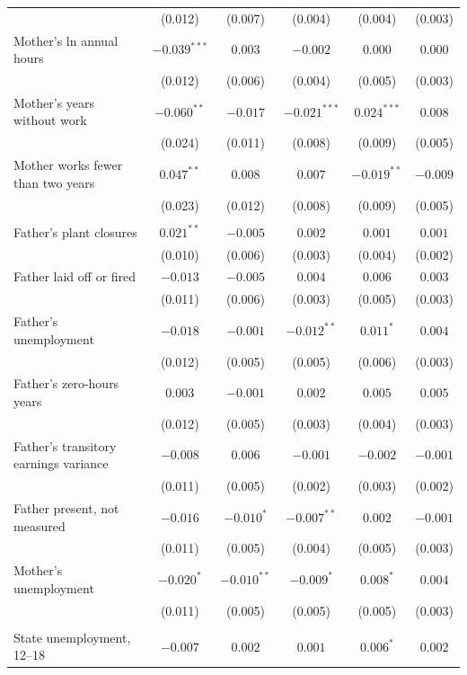 \begin{table}[!htbp]
{{\begin{tabular}{lccccc}
 & (0.012) & (0.007) & (0.004) & (0.004) & (0.003) \\
Mother's ln annual hours & $-0.039^{***}$ & $0.003$ & $-0.002$ & $0.000$ & $0.000$ \\
 & (0.012) & (0.006) & (0.004) & (0.005) & (0.003) \\
Mother's years without work & $-0.060^{**}$ & $-0.017$ & $-0.021^{***}$ & $0.024^{***}$ & $0.008$ \\
 & (0.024) & (0.011) & (0.008) & (0.009) & (0.005) \\
Mother works fewer than two years & $0.047^{**}$ & $0.008$ & $0.007$ & $-0.019^{**}$ & $-0.009$ \\
 & (0.023) & (0.012) & (0.008) & (0.009) & (0.005) \\
\addlinespace
\multicolumn{6}{l}{\textit{D. Spells}} \\
Father's plant closures & $0.021^{**}$ & $-0.005$ & $0.002$ & $0.001$ & $0.001$ \\
 & (0.010) & (0.006) & (0.003) & (0.004) & (0.002) \\
Father laid off or fired & $-0.013$ & $-0.005$ & $0.004$ & $0.006$ & $0.003$ \\
 & (0.011) & (0.006) & (0.003) & (0.005) & (0.003) \\
Father's unemployment & $-0.018$ & $-0.001$ & $-0.012^{**}$ & $0.011^{*}$ & $0.004$ \\
 & (0.012) & (0.005) & (0.005) & (0.006) & (0.003) \\
Father's zero-hours years & $0.003$ & $-0.001$ & $0.002$ & $0.005$ & $0.005$ \\
 & (0.012) & (0.005) & (0.003) & (0.004) & (0.003) \\
Father's transitory earnings variance & $-0.008$ & $0.006$ & $-0.001$ & $-0.002$ & $-0.001$ \\
 & (0.011) & (0.005) & (0.002) & (0.003) & (0.002) \\
Father present, not measured & $-0.016$ & $-0.010^{*}$ & $-0.007^{**}$ & $0.002$ & $-0.001$ \\
 & (0.011) & (0.005) & (0.004) & (0.005) & (0.003) \\
Mother's unemployment & $-0.020^{*}$ & $-0.010^{**}$ & $-0.009^{*}$ & $0.008^{*}$ & $0.004$ \\
 & (0.011) & (0.005) & (0.005) & (0.005) & (0.003) \\
\addlinespace
\multicolumn{6}{l}{\textit{E. Place}} \\
State unemployment, 12--18 & $-0.007$ & $0.002$ & $0.001$ & $0.006^{*}$ & $0.002$ \\

\end{tabular}}}
\end{table}

